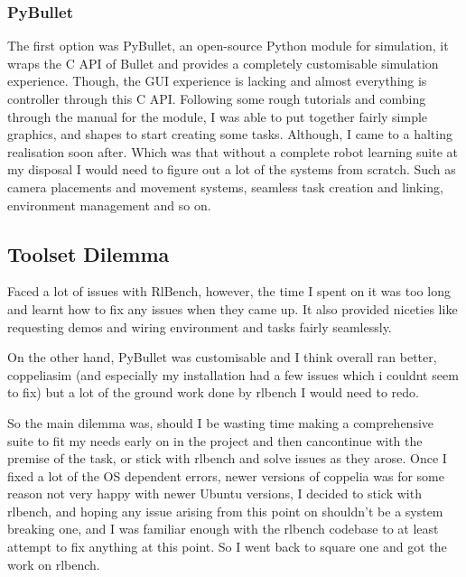 
\subsubsection{PyBullet}
The first option was PyBullet, an open-source Python module for simulation, it wraps the C API of Bullet and provides a completely customisable simulation experience. Though, the GUI experience is lacking and almost everything is controller through this C API. 
Following some rough tutorials and combing through the manual for the module, I was able to put together fairly simple graphics, and shapes to start creating some tasks. Although, I came to a halting realisation soon after. Which was that without a complete robot learning suite at my disposal I would need to figure out a lot of the systems from scratch. Such as camera placements and movement systems, seamless task creation and linking, environment management and so on.


\subsection{Toolset Dilemma}

Faced a lot of issues with RlBench, however, the time I spent on it was too long and learnt how to fix any issues when they came up. It also provided niceties like requesting demos and wiring environment and tasks fairly seamlessly.

On the other hand, PyBullet was customisable and I think overall ran better, coppeliasim (and especially my installation had a few issues which i couldnt seem to fix) but a lot of the ground work done by rlbench I would need to redo. 

So the main dilemma was, should I be wasting time making a comprehensive suite to fit my needs early on in the project and then cancontinue with the premise of the task, or stick with rlbench and solve issues as they arose. Once I fixed a lot of the OS dependent errors, newer versions of coppelia was for some reason not very happy with newer Ubuntu versions, I decided to stick with rlbench, and hoping any issue arising from this point on shouldn't be a system breaking one, and I was familiar enough with the rlbench codebase to at least attempt to fix anything at this point. So I went back to square one and got the work on rlbench.



